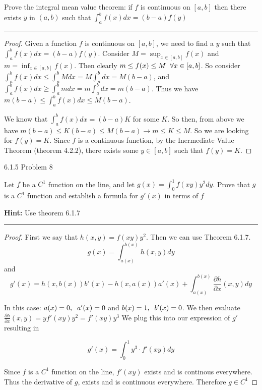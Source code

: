 \documentclass[11pt]{article}
\begin{document}
Prove the integral mean value theorem: if $f$ is continuous on $[a,b]$ then there exists $y$ in $(a,b)$ 
such that $\int_a ^b f(x) dx = (b - a)f(y)$
\hrule


\begin{proof}
    Given a function $f$ is continuous on $[a,b]$, we need to find a $y$ such that $\int_a ^b f(x) dx = (b-a) f(y)$. 
    Consider $M = \sup_{x \in [a,b]}f(x)$ and $m = \inf_{x \in [a,b]}f(x)$. Then clearly $m \leq f(x) \leq M \sp \forall x \in [a,b]$. 
    So consider $\int_a ^b f(x)dx \leq \int_a ^b Mdx = M \int_a ^b dx = M(b - a)$, and $\int_a ^b f(x)dx \geq \int_a ^b mdx = m \int_a ^b dx = m(b - a)$.
    Thus we have $m (b - a) \leq \int_a ^b f(x) dx \leq M (b - a)$.

    We know that $\int_a ^b f(x) dx = (b - a) K$ for some $K$. So then, from above we have $m (b - a) \leq K (b-a) \leq M (b - a) \rightarrow m \leq K \leq M$.
    So we are looking for $f(y) = K$. Since $f$ is a continuous function, by the Inermediate Value Theorem (theorem 4.2.2), there exists some $y \in [a,b]$ such that $f(y) = K$.

\end{proof}





 6.1.5 Problem 8

Let $f$ be a $C^1$ function on the line, and let $g(x) = \int_0 ^1 f(xy)y^2 dy$.
Prove that $g$ is a $C^1$ function and establish a formula for $g'(x)$ in terms of $f$

\textbf{Hint:} Use theorem 6.1.7
\hrule

\begin{proof}
    First we say that $h(x,y) = f(xy)y^2$. Then we can use Theorem 6.1.7. $$g(x) = \int_{a(x)} ^{b(x)} h(x,y) dy$$
    and $$g'(x) = h(x, b(x))b'(x) - h(x, a(x))a'(x) + \int_{a(x)} ^{b(x)} \frac{\partial h}{\partial x}(x,y)dy$$

    In this case: $a(x) = 0, \sp a'(x) = 0$ and $b(x) = 1, \sp b'(x) = 0$. 
    We then evaluate $\frac{\partial h}{\partial x}(x,y) = y f'(xy)y^2 = f'(xy) y^3$
    We plug this into our expression of $g'$ resulting in 

    $$g'(x) = \int_0 ^1 y^3 \cdot f'(xy) dy$$

    Since $f$ is a $C^1$ function on the line, $f'(xy)$ exists and is continous everywhere. 
    Thus the derivative of $g$, exists and is continuous everywhere. Therefore $g \in C^1$
\end{proof}
\end{document}
